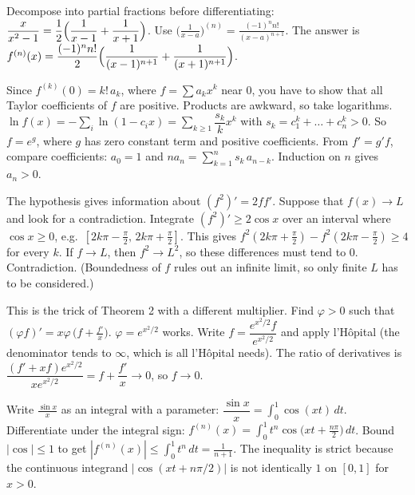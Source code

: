 \documentclass[11pt,a4paper]{article}
\begin{document}

 Decompose into partial fractions before differentiating: $\dfrac{x}{x^2-1}=\dfrac12\Bigl(\dfrac1{x-1}+\dfrac1{x+1}\Bigr)$.
 Use $\bigl(\frac1{x-a}\bigr)^{(n)}=\frac{(-1)^n n!}{(x-a)^{n+1}}$. The answer is
$f^{(n)}(x)=\dfrac{(-1)^n n!}{2}\Bigl(\dfrac1{(x-1)^{n+1}}+\dfrac1{(x+1)^{n+1}}\Bigr)$.

 Since $f^{(k)}(0)=k!\,a_k$, where $f=\sum a_kx^k$ near $0$, you have to show that all Taylor coefficients of $f$ are positive. Products are awkward, so take logarithms.
 $\ln f(x)=-\sum_i\ln(1-c_ix)=\sum_{k\ge1}\dfrac{s_k}{k}x^k$ with $s_k=c_1^k+\dots+c_n^k>0$. So $f=e^{g}$, where $g$ has zero constant term and positive coefficients.
 From $f'=g'f$, compare coefficients: $a_0=1$ and $n a_n=\sum_{k=1}^{n}s_k\,a_{n-k}$. Induction on $n$ gives $a_n>0$.

 The hypothesis gives information about $(f^2)'=2ff'$. Suppose that $f(x)\to L$ and look for a contradiction.
 Integrate $(f^2)'\ge 2\cos x$ over an interval where $\cos x\ge0$, e.g.\ $[2k\pi-\frac\pi2,\,2k\pi+\frac\pi2]$. This gives $f^2(2k\pi+\frac\pi2)-f^2(2k\pi-\frac\pi2)\ge4$ for every $k$.
 If $f\to L$, then $f^2\to L^2$, so these differences must tend to $0$. Contradiction. (Boundedness of $f$ rules out an infinite limit, so only finite $L$ has to be considered.)

 This is the trick of Theorem 2 with a different multiplier. Find $\varphi>0$ such that $(\varphi f)'=x\varphi\,\bigl(f+\frac{f'}{x}\bigr)$.
 $\varphi=e^{x^2/2}$ works. Write $f=\dfrac{e^{x^2/2}f}{e^{x^2/2}}$ and apply l'H\^opital (the denominator tends to $\infty$, which is all l'H\^opital needs).
 The ratio of derivatives is $\dfrac{(f'+xf)e^{x^2/2}}{xe^{x^2/2}}=f+\dfrac{f'}{x}\to0$, so $f\to0$.

 Write $\frac{\sin x}{x}$ as an integral with a parameter: $\dfrac{\sin x}{x}=\displaystyle\int_0^1\cos(xt)\,dt$.
 Differentiate under the integral sign: $f^{(n)}(x)=\displaystyle\int_0^1 t^n\cos\bigl(xt+\tfrac{n\pi}{2}\bigr)\,dt$.
 Bound $|\cos|\le1$ to get $|f^{(n)}(x)|\le\int_0^1t^n\,dt=\frac1{n+1}$. The inequality is strict because the continuous integrand $|\cos(xt+n\pi/2)|$ is not identically $1$ on $[0,1]$ for $x>0$.
\end{document}
